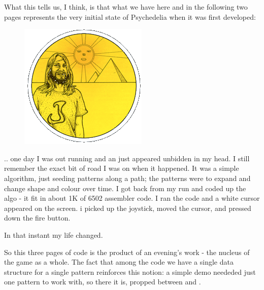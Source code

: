What this tells us, I think, is that what we have here and in the following two pages represents the very initial state
of Psychedelia when it was first developed: 

\begin{definition}
\setlength{\intextsep}{0pt}%
\setlength{\columnsep}{3pt}%
\begin{figure}
\includegraphics[width=\linewidth]{src/callout/psych.png} 
\end{figure}
\small
.. one day I was out running and an just appeared unbidden in my head. I still
  remember the exact bit of road I was on when it happened. It was a
  simple algorithm, just seeding patterns along a path; the patterns were to
  expand and change shape and colour over time. I got back from my run and
  coded up the algo - it fit in about 1K of 6502 assembler code. I ran the code
  and a white cursor appeared on the screen. i picked up the joystick, moved
  the cursor, and pressed down the fire button.

In that instant my life changed.
\end{definition}

So this three pages of code is the product of an evening's work - the nucleus of the game as a whole. The fact that among
the code we have a single data structure for a single pattern reinforces this notion: a simple demo neededed just one
pattern to work with, so there it is, propped between  and .

